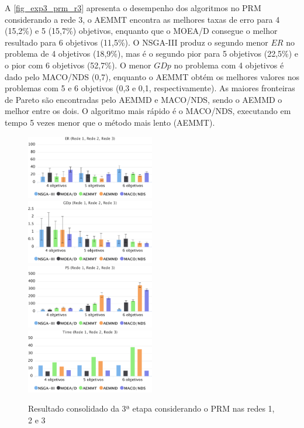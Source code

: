 A \autoref{fig_exp3_prm_r3} apresenta o desempenho dos algoritmos no PRM considerando a rede 3, o AEMMT encontra as melhores taxas de erro para 4 (15,2\%) e 5 (15,7\%) objetivos, enquanto que o MOEA/D consegue o melhor resultado para 6 objetivos (11,5\%). O NSGA-III produz o segundo menor $ER$ no problema de 4 objetivos (18,9\%), mas é o segundo pior para 5 objetivos (22,5\%) e o pior com 6 objetivos (52,7\%). O menor $GDp$ no problema com 4 objetivos é dado pelo MACO/NDS (0,7), enquanto o AEMMT obtém os melhores valores nos problemas com 5 e 6 objetivos (0,3 e 0,1, respectivamente). As maiores fronteiras de Pareto são encontradas pelo AEMMD e MACO/NDS, sendo o AEMMD o melhor entre os dois. O algoritmo mais rápido é o MACO/NDS, executando em tempo 5 vezes menor que o método mais lento (AEMMT).

\begin{figure}[!htbp]	
	\includegraphics[width=0.5\textwidth]{cap_experimentos/figs/etapa3/er-mrp-todos}
	\includegraphics[width=0.5\textwidth]{cap_experimentos/figs/etapa3/gd-mrp-todos}
	\includegraphics[width=0.5\textwidth]{cap_experimentos/figs/etapa3/ps-mrp-todos}
	\includegraphics[width=0.5\textwidth]{cap_experimentos/figs/etapa3/time-mrp-todos}
	\caption{\label{fig_exp3_prm_todos}Resultado consolidado da 3ª etapa considerando o PRM nas redes 1, 2 e 3}
\end{figure}

